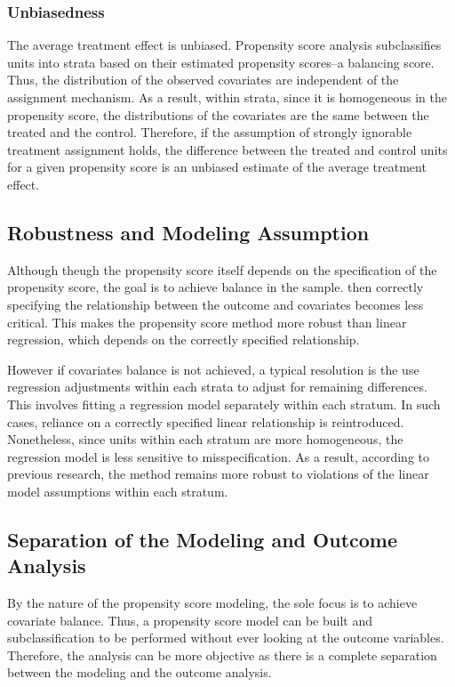 \documentclass[12pt]{article}
\begin{document}
\subsubsection{Unbiasedness}

The average treatment effect is unbiased. Propensity score analysis subclassifies units into strata based on their estimated propensity scores--a balancing score. Thus, the distribution of the observed covariates are independent of the assignment mechanism. As a result, within strata, since it is homogeneous in the propensity score, the distributions of the covariates are the same between the treated and the control. Therefore, if the assumption of strongly ignorable treatment assignment holds, the difference between the treated and control units for a given propensity score is an unbiased estimate of the average treatment effect.


\subsection{Robustness and Modeling Assumption}

Although theugh the propensity score itself depends on the specification of the propensity score, the goal is to achieve balance in the sample. then correctly specifying the relationship between the outcome and covariates becomes less critical. This makes the propensity score method more robust than linear regression, which depends on the correctly specified relationship.

However if covariates balance is not achieved, a typical resolution is the use regression adjustments within each strata to adjust for remaining differences. This involves fitting a regression model separately within each stratum. In such cases, reliance on a correctly specified linear relationship is reintroduced. Nonetheless, since units within each stratum are more homogeneous, the regression model is less sensitive to misspecification. As a result, according to previous research, the method remains more robust to violations of the linear model assumptions within each stratum.



\subsection{Separation of the Modeling and Outcome Analysis}

By the nature of the propensity score modeling, the sole focus is to achieve covariate balance. Thus, a propensity score model can be built and subclassification to be performed without ever looking at the outcome variables. Therefore, the analysis can be more objective as there is a complete separation between the modeling and the outcome analysis.
\end{document}
